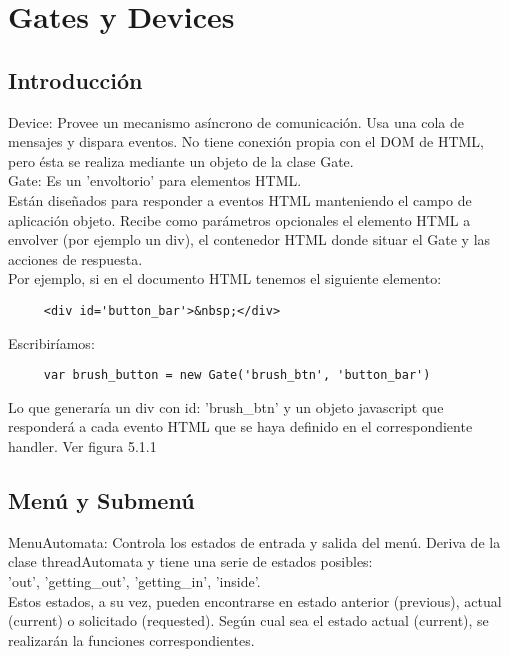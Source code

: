 \section{Gates y Devices}
\label{sec:gates_devices}

\subsection{Introducción}
\label{subsection:intro_gates}

Device: Provee un mecanismo asíncrono de comunicación. Usa una cola de mensajes y dispara eventos. No tiene conexión propia con el DOM de HTML,
pero ésta se realiza mediante un objeto de la clase Gate.\\

Gate: Es un 'envoltorio' para elementos HTML.\\

Están diseñados para responder a eventos HTML manteniendo el campo de aplicación objeto. Recibe como parámetros opcionales el elemento HTML a 
envolver (por ejemplo un div), el contenedor HTML donde situar el Gate y las acciones de respuesta.\\

Por ejemplo, si en el documento HTML tenemos el siguiente elemento:
\begin{verbatim}
     <div id='button_bar'>&nbsp;</div>
\end{verbatim}
Escribiríamos:
\begin{verbatim}
     var brush_button = new Gate('brush_btn', 'button_bar')
\end{verbatim}
Lo que generaría un div con id: 'brush\_btn' y un objeto javascript que responderá a cada evento HTML que se haya definido en el correspondiente 
handler. Ver figura 5.1.1


\subsection{Menú y Submenú}
\label{subsection:menu}

MenuAutomata: Controla los estados de entrada y salida del menú. Deriva de la clase threadAutomata y tiene una serie de estados posibles:\\
'out', 'getting\_out', 'getting\_in', 'inside'.\\
Estos estados, a su vez, pueden encontrarse en estado anterior (previous), actual (current) o solicitado (requested). Según cual sea  el estado 
actual (current), se realizarán la funciones correspondientes.\\

